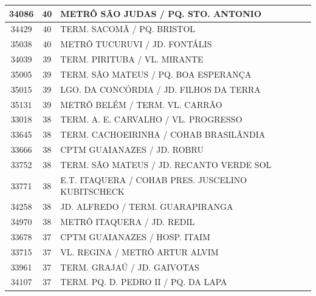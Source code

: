 \documentclass[
	12pt,				%
	oneside,			%
	a4paper,			%
	english,			%
	brazil				%
	]{abntex2ppgsi}
\begin{document}
{{\begin{apendicesenv}
\begin{longtable}{c|c|p{7cm}}
    34086 & 40    & METRÔ SÃO JUDAS / PQ. STO. ANTONIO \\
\hline

    34429 & 40    & TERM. SACOMÃ / PQ. BRISTOL \\
\hline

    35038 & 40    & METRÔ TUCURUVI / JD. FONTÁLIS \\
\hline

    34039 & 39    & TERM. PIRITUBA / VL. MIRANTE \\
\hline

    35005 & 39    & TERM. SÃO MATEUS / PQ. BOA ESPERANÇA \\
\hline

    35015 & 39    & LGO. DA CONCÓRDIA / JD. FILHOS DA TERRA \\
\hline

    35131 & 39    & METRÔ BELÉM / TERM. VL. CARRÃO \\
\hline

    33018 & 38    & TERM. A. E. CARVALHO / VL. PROGRESSO \\
\hline

    33645 & 38    & TERM. CACHOEIRINHA / COHAB BRASILÂNDIA \\
\hline

    33666 & 38    & CPTM GUAIANAZES / JD. ROBRU \\
\hline

    33752 & 38    & TERM. SÃO MATEUS / JD. RECANTO VERDE SOL \\
\hline

    33771 & 38    & E.T. ITAQUERA / COHAB PRES. JUSCELINO KUBITSCHECK \\
\hline

    34258 & 38    & JD. ALFREDO / TERM. GUARAPIRANGA \\
\hline

    34970 & 38    & METRÔ ITAQUERA / JD. REDIL \\
\hline

    33678 & 37    & CPTM GUAIANAZES / HOSP. ITAIM \\
\hline

    33715 & 37    & VL. REGINA / METRÔ ARTUR ALVIM \\
\hline

    33961 & 37    & TERM. GRAJAÚ / JD. GAIVOTAS \\
\hline

    34107 & 37    & TERM. PQ. D. PEDRO II / PQ. DA LAPA \\
\hline


\end{longtable}
\end{apendicesenv}}}
\end{document}
